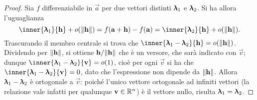 \begin{proof}
Sia $f$ differenziabile in $\vec a$ per due vettori distinti $\bm{\uplambda}_1$ e $\bm{\uplambda}_2$. Si ha allora l'uguaglianza
\[
\inner{\vlambda_1}{\vec h}+o(\norm{\vec h})=f(\vec a+\vec h)-f(\vec a)=\inner{\vlambda_2}{\vec h}+o(\norm{\vec h}).
\]
Trascurando il membro centrale si trova che $\inner{\vlambda_1-\vlambda_2}{\vec h}=o(\norm{\vec h})$. Dividendo per $\lVert\mathbf{h}\rVert$, si ottiene $\mathbf{h}/\lVert\mathbf{h}\rVert$ che è un versore, che sarà indicato con $\vec v$; dunque $\inner{\vlambda_1-\vlambda_2}{\vec v}=o(1)$, cioè per ogni $\vec v$ si ha che $\inner{\vlambda_1-\vlambda_2}{\vec v}=0$, dato che l'espressione non dipende da $\lVert\mathbf{h}\rVert$. Allora $\bm{\uplambda}_1-\bm{\uplambda}_2$ è ortogonale a $\vec v$: poiché l'unico vettore ortogonale ad infiniti vettori (la relazione vale infatti per qualunque $\mathbf{v}\in\mathbb{R}^n$) è il vettore nullo, risulta $\bm{\uplambda}_1=\bm{\uplambda}_2$.
\end{proof}

